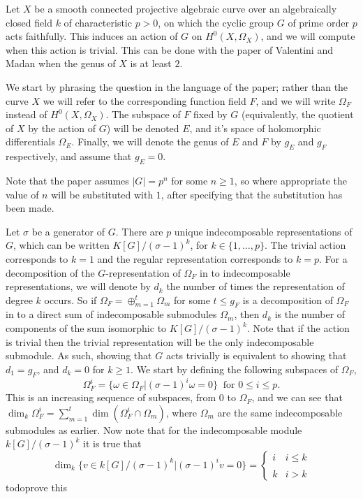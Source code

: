 Let $X$ be a smooth connected projective algebraic curve over an algebraically closed field $k$ of characteristic $p>0$, on which the cyclic group $G$ of prime order $p$ acts faithfully.
This induces an action of $G$ on $H^0(X,\Omega_X)$, and we will compute when this action is trivial.
This can be done with the paper of Valentini and Madan \cite{valmadan} when the genus of $X$ is at least $2$.

We start by phrasing the question in the language of the paper; rather than the curve $X$ we will refer to the corresponding function field $F$, and we will write $\Omega_F$ instead of $H^0(X,\Omega_X)$.
The subspace of $F$ fixed by $G$ (equivalently, the quotient of $X$ by the action of $G$) will be denoted $E$, and it's space of holomorphic differentials $\Omega_E$.
Finally, we will denote the genus of $E$ and $F$ by $g_E$ and $g_F$ respectively, and assume that $g_E=0$.

Note that the paper assumes $|G|=p^n$ for some $n \geq 1$, so where appropriate the value of $n$ will be substituted with $1$, after specifying that the substitution has been made.

Let $\sigma$ be a generator of $G$. 
There are $p$ unique indecomposable representations of $G$, which can be written $K[G]/(\sigma - 1)^k$, for $k\in \{1,\ldots, p\}$.
The trivial action corresponds to $k=1$ and the regular representation corresponds to $k=p$.
For a decomposition of the $G$-representation of $\Omega_F$ in to indecomposable representations, we will denote by $d_k$ the number of times the representation of degree $k$ occurs.
So if $\Omega_F = \oplus_{m=1}^t \Omega_m$ for some $t\leq g_F$ is a decomposition of $\Omega_F$ in to a direct sum of indecomposable submodules $\Omega_m$, then $d_k$ is the number of components of the sum isomorphic to $K[G]/(\sigma -1)^k.$
Note that if the action is trivial then the trivial representation will be the only indecomposable submodule. 
As such, showing that $G$ acts trivially is equivalent to showing that $d_1 = g_F$, and $d_k= 0 $ for $k \geq 1$.
We start by defining the following subspaces of $\Omega_F$,
    \begin{equation*}
    \Omega_F^i = \{\omega\in \Omega_F | (\sigma - 1)^i\omega=0\}\ \mbox{ for } 0\leq i \leq p.
    \end{equation*}
This is an increasing sequence of subspaces, from $0$ to $\Omega_F$, and we can see that $\dim_k\Omega_F^i = \sum_{m=1}^t\dim(\Omega_F^i \cap \Omega_m)$, where $\Omega_m$ are the same indecomposable submodules as earlier.
Now note that for the indecomposable module $k[G]/(\sigma - 1)^k$ it is true that 
    \[
    \dim_k\{v \in k[G]/(\sigma - 1)^k | (\sigma - 1)^iv = 0\} = \left\{     
        \begin{array}{ll}
        i & i\leq k \\
        \\
        k & i > k
        \end{array} 
    \right.
    \]todo{prove this}

